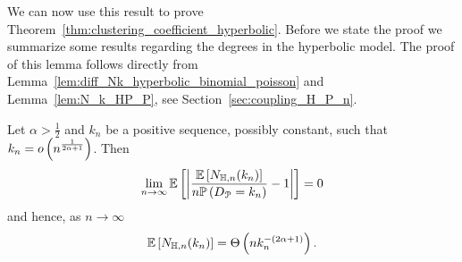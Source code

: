 We can now use this result to prove Theorem~\ref{thm:clustering_coefficient_hyperbolic}. Before we state the proof we summarize some results regarding the degrees in the hyperbolic model. The proof of this lemma follows directly from Lemma~\ref{lem:diff_Nk_hyperbolic_binomial_poisson} and Lemma~\ref{lem:N_k_HP_P}, see Section~\ref{sec:coupling_H_P_n}.

\begin{lemma}\label{lem:N_k_H_P}
Let $\alpha > \frac{1}{2}$ and $k_n$ be a positive sequence, possibly constant, such that $k_n = o\left(n^{\frac{1}{2\alpha + 1}}\right)$. Then
\[
	\lim_{n\to \infty} \mathbb{E}\left[\left|\frac{\mathbb{E}\left[N_{\mathbb{H},n}(k_n)\right]}{n \mathbb{P}\left(D_{{\mathcal P}} = k_n\right)} - 1\right|\right] = 0
\]
and hence, as $n \to \infty$
\[
	\mathbb{E}\left[N_{\mathbb{H},n}(k_n)\right] = \Theta\left(n k_n^{-(2\alpha + 1)}\right).
\]
\end{lemma}

